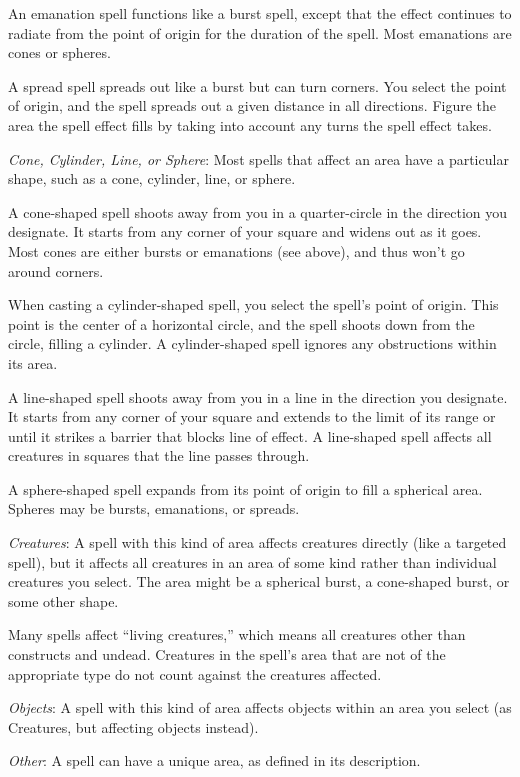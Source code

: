 An emanation spell functions like a burst spell, except that the effect continues to radiate from the point of origin for the duration of the spell. Most emanations are cones or spheres.

A spread spell spreads out like a burst but can turn corners. You select the point of origin, and the spell spreads out a given distance in all directions. Figure the area the spell effect fills by taking into account any turns the spell effect takes.

\textit{Cone, Cylinder, Line, or Sphere}: Most spells that affect an area have a particular shape, such as a cone, cylinder, line, or sphere.

A cone-shaped spell shoots away from you in a quarter-circle in the direction you designate. It starts from any corner of your square and widens out as it goes. Most cones are either bursts or emanations (see above), and thus won't go around corners.

When casting a cylinder-shaped spell, you select the spell's point of origin. This point is the center of a horizontal circle, and the spell shoots down from the circle, filling a cylinder. A cylinder-shaped spell ignores any obstructions within its area.

A line-shaped spell shoots away from you in a line in the direction you designate. It starts from any corner of your square and extends to the limit of its range or until it strikes a barrier that blocks line of effect. A line-shaped spell affects all creatures in squares that the line passes through.

A sphere-shaped spell expands from its point of origin to fill a spherical area. Spheres may be bursts, emanations, or spreads.

\textit{Creatures}: A spell with this kind of area affects creatures directly (like a targeted spell), but it affects all creatures in an area of some kind rather than individual creatures you select. The area might be a spherical burst, a cone-shaped burst, or some other shape.

Many spells affect ``living creatures,'' which means all creatures other than constructs and undead. Creatures in the spell's area that are not of the appropriate type do not count against the creatures affected.

\textit{Objects}: A spell with this kind of area affects objects within an area you select (as Creatures, but affecting objects instead).

\textit{Other}: A spell can have a unique area, as defined in its description.

